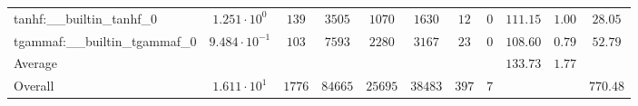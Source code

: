 \begin{tabular}{|l|c|c|c|c|c|c|c|c|c|c|}
tanhf:\_\_builtin\_tanhf\_0               & $ 1.251 \cdot 10^{0}  $ & $ 139    $ & $ 3505  $ & $ 1070  $ & $ 1630  $ & $ 12  $ & $ 0 $ & $ 111.15      $ & $ 1.00    $ & $ 28.05   $ \\
tgammaf:\_\_builtin\_tgammaf\_0           & $ 9.484 \cdot 10^{-1} $ & $ 103    $ & $ 7593  $ & $ 2280  $ & $ 3167  $ & $ 23  $ & $ 0 $ & $ 108.60      $ & $ 0.79    $ & $ 52.79   $ \\
\hline
Average                                   & $                     $ & $        $ & $       $ & $       $ & $       $ & $     $ & $   $ & $ 133.73      $ & $ 1.77    $ & $         $ \\
\hline
Overall                                   & $ 1.611 \cdot 10^{1}  $ & $ 1776   $ & $ 84665 $ & $ 25695 $ & $ 38483 $ & $ 397 $ & $ 7 $ & $             $ & $         $ & $ 770.48  $ \\
\hline
\end{tabular}
